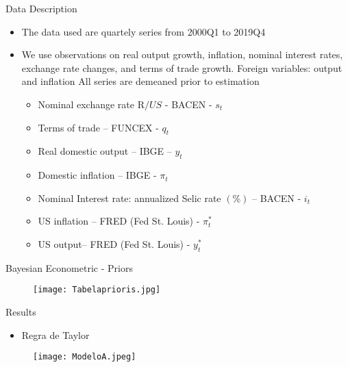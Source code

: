 \documentclass[9pt]{beamer}
\let\olditem\item
\renewcommand{\item}{%
\olditem\vspace{\fill}}
\begin{document}
\begin{frame}{Data Description}
\begin{itemize}
    \item The data used are quartely series from 2000Q1 to 2019Q4
    
    \item We use observations on real output growth, inflation, nominal interest rates, exchange rate changes, and terms of trade growth. Foreign variables: output and inflation All series are demeaned prior to estimation
    
    \begin{itemize}
        \item 	Nominal exchange rate R$/US$ - BACEN - $s_t$
        
        \item 	Terms of trade – FUNCEX - $q_t$
        
        \item 	Real domestic output – IBGE – $y_t$
        
        \item 	Domestic inflation – IBGE - $\pi_t$
        
        \item 	Nominal Interest rate: annualized Selic rate $(\%)$ – BACEN - $i_t$
        
        \item 	US inflation – FRED (Fed St. Louis) -  $\pi_t^{*}$
        
        \item US output– FRED (Fed St. Louis) -  $y_t^{*}$
    \end{itemize}
    
    
\end{itemize}
\end{frame}
\begin{frame}{Bayesian Econometric - Priors}
\begin{figure}[H]
\centering
\texttt{[image: Tabelaprioris.jpg]}
\end{figure}


\end{frame}
\begin{frame}{Results}
\begin{itemize}
    \item Regra de Taylor
\end{itemize}
\begin{figure}[H]
\centering
\texttt{[image: ModeloA.jpeg]}
\end{figure}

\end{frame}
\end{document}
